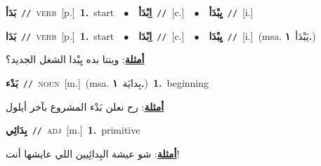 \documentclass[10pt,a4paper,twoside]{article} %
\begin{document}
\begin{multicols}{2}
{\setlength\topsep{0pt}\textbf{\foreignlanguage{arabic}{بَدَأ}}\ {\color{gray}\texttt{//}\color{black}}\ \textsc{verb}\ [p.]\ \textbf{1.}~start\ \ $\bullet$\ \ \setlength\topsep{0pt}\textbf{\foreignlanguage{arabic}{اِبْدَأ}}\ {\color{gray}\texttt{//}\color{black}}\ [c.]\ \ $\bullet$\ \ \setlength\topsep{0pt}\textbf{\foreignlanguage{arabic}{يِبْدَأ}}\ {\color{gray}\texttt{//}\color{black}}\ [i.]\ } \vspace{2mm}

{\setlength\topsep{0pt}\textbf{\foreignlanguage{arabic}{بَدَا}}\ {\color{gray}\texttt{//}\color{black}}\ \textsc{verb}\ [p.]\ \textbf{1.}~start\ \ $\bullet$\ \ \setlength\topsep{0pt}\textbf{\foreignlanguage{arabic}{اِبْدَا}}\ {\color{gray}\texttt{//}\color{black}}\ [c.]\ \ $\bullet$\ \ \setlength\topsep{0pt}\textbf{\foreignlanguage{arabic}{يِبْدَا}}\ {\color{gray}\texttt{//}\color{black}}\ [i.]\ \color{gray}(msa. \foreignlanguage{arabic}{يَبْدَأ}~\foreignlanguage{arabic}{\textbf{١.}})\color{black}\  \begin{flushright}\color{gray}\foreignlanguage{arabic}{\textbf{\underline{\foreignlanguage{arabic}{أمثلة}}}: وينتا بده يِبْدا الشغل الجديد؟}\end{flushright}\color{black}} \vspace{2mm}

{\setlength\topsep{0pt}\textbf{\foreignlanguage{arabic}{بَدْء}}\ {\color{gray}\texttt{//}\color{black}}\ \textsc{noun}\ [m.]\ \color{gray}(msa. \foreignlanguage{arabic}{بِدايَة}~\foreignlanguage{arabic}{\textbf{١.}})\color{black}\ \textbf{1.}~beginning\  \begin{flushright}\color{gray}\foreignlanguage{arabic}{\textbf{\underline{\foreignlanguage{arabic}{أمثلة}}}: رح نعلن بَدْء المشروع بآخر أيلول}\end{flushright}\color{black}} \vspace{2mm}

{\setlength\topsep{0pt}\textbf{\foreignlanguage{arabic}{بِدَائِي}}\ {\color{gray}\texttt{//}\color{black}}\ \textsc{adj}\ [m.]\ \textbf{1.}~primitive\  \begin{flushright}\color{gray}\foreignlanguage{arabic}{\textbf{\underline{\foreignlanguage{arabic}{أمثلة}}}: شو عيشة البِدائِيين اللي عايشها أنت!}\end{flushright}\color{black}} \vspace{2mm}


\end{multicols}
\end{document}
